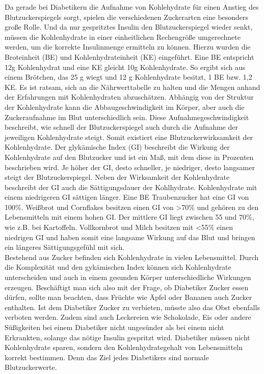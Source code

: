 		Da gerade bei Diabetikern die Aufnahme von Kohlehydrate für einen Anstieg des Blutzuckerspiegels sorgt, spielen die verschiedenen Zuckerarten eine besonders große Rolle. Und da nur gespritztes Insulin den Blutzuckerspiegel wieder senkt, müssen die Kohlenhydrate in einer einheitlichen Rechengröße umgerechnete werden, um die korrekte Insulinmenge ermitteln zu können. Hierzu wurden die Broteinheit (BE) und Kohlenhydrateinheit (KE) eingeführt. Eine BE entspricht 12g Kohlenhydrat und eine KE gleicht 10g Kohlenhydrate. So ergibt sich aus einem Brötchen, das 25 g wiegt und 12 g Kohlenhydrate besitzt, 1 BE bzw. 1,2 KE. Es ist ratsam, sich an die Nährwerttabelle zu halten und die Mengen anhand der Erfahrungen mit Kohlenhydraten abzuschätzen.\newline
		Abhängig von der Struktur der Kohlenhydrate kann die Abbaugeschwindigkeit im Körper, aber auch die Zuckeraufnahme im Blut unterschiedlich sein. Diese Aufnahmegeschwindigkeit beschreibt, wie schnell der Blutzuckerspiegel auch durch die Aufnahme der jeweiligen Kohlenhydrate steigt. Somit existiert eine \glqq Blutzuckerwirksamkeit der Kohlenhydrate\grqq{}. Der glykämische Index (GI) beschreibt die Wirkung der Kohlenhydrate auf den Blutzucker und ist ein Maß, mit dem diese in Prozenten beschrieben wird. Je höher der GI, desto schneller, je niedriger, desto langsamer steigt der Blutzuckerspiegel. Neben der Wirksamkeit der Kohlenhydrate beschreibt der GI auch die Sättigungsdauer der Kohlhydrate. Kohlenhydrate mit einem niedrigeren GI sättigen länger. \newline
		Eine BE Traubenzucker hat eine GI von 100\%. Weißbrot und Cornflakes besitzen einen GI von >70\% und gehören zu den Lebensmitteln mit einem hohen GI. Der mittlere GI liegt zwischen 55 und 70\%, wie z.B. bei Kartoffeln. Vollkornbrot und Milch besitzen mit <55\% einen niedrigen GI und haben somit eine langsame Wirkung auf das Blut und bringen ein längeres Sättigungsgefühl mit sich.\cite{SG}\\
		Bestehend aus Zucker befinden sich Kohlenhydrate in vielen Lebensmittel. Durch die Komplexität und den gykämischen Index können sich Kohlenhydrate unterscheiden und auch in einem gesunden Körper unterschiedliche Wirkungen erzeugen. Beschäftigt man sich also mit der Frage, ob Diabetiker Zucker essen dürfen, sollte man beachten, dass Früchte wie Äpfel oder Bananen auch Zucker enthalten. Ist dem Diabetiker Zucker zu verbieten, müsste also das Obst ebenfalls verboten werden. Zudem sind auch Leckereien wie Schokolade, Eis oder andere Süßigkeiten bei einem Diabetiker nicht ungesünder als bei einem nicht Erkrankten, solange das nötige Insulin gespritzt wird. Diabetiker müssen nicht Kohlenhydrate sparen, sondern den Kohlenhydrategehalt von Lebensmitteln korrekt bestimmen. Denn das Ziel jedes Diabetikers sind normale Blutzuckerwerte.\cite{SG}		
